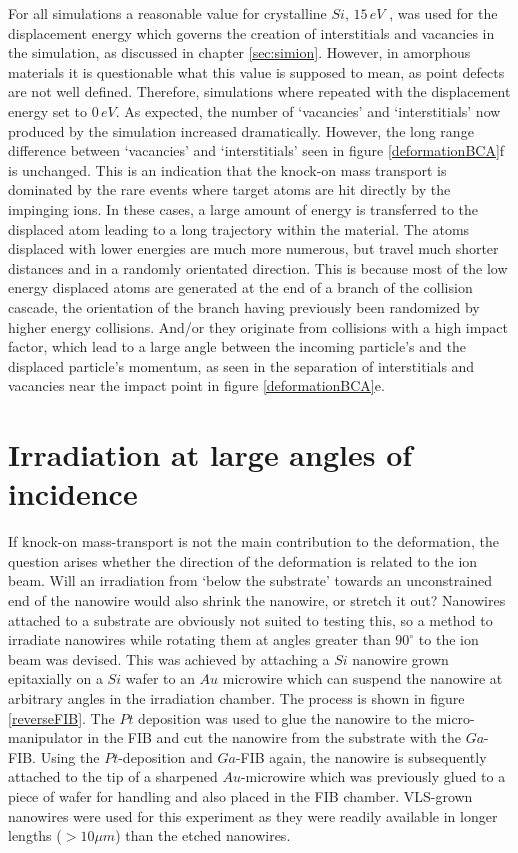 For all simulations a reasonable value for crystalline $Si$, $15\,eV$ \cite{corbett_production_1965}, was used for the displacement energy which governs the creation of interstitials and vacancies in the simulation, as discussed in chapter \ref{sec:simion}. However, in amorphous materials it is questionable what this value is supposed to mean, as point defects are not well defined. Therefore, simulations where repeated with the displacement energy set to $0\,eV$. As expected, the number of `vacancies' and `interstitials' now produced by the simulation increased dramatically. However, the long range difference between `vacancies' and `interstitials' seen in figure \ref{deformationBCA}f is unchanged. This is an indication that the knock-on mass transport is dominated by the rare events where target atoms are hit directly by the impinging ions. In these cases, a large amount of energy is transferred to the displaced atom leading to a long trajectory within the material. The atoms displaced with lower energies are much more numerous, but travel much shorter distances and in a randomly orientated direction. This is because most of the low energy displaced atoms are generated at the end of a branch of the collision cascade, the orientation of the branch having previously been randomized by higher energy collisions. And/or they originate from collisions with a high impact factor, which lead to a large angle between the incoming particle's and the displaced particle's momentum, as seen in the separation of interstitials and vacancies near the impact point in figure \ref{deformationBCA}e.

\section{Irradiation at large angles of incidence}

If knock-on mass-transport is not the main contribution to the deformation, the question arises whether the direction of the deformation is related to the ion beam. Will an irradiation from `below the substrate' towards an unconstrained end of the nanowire would also shrink the nanowire, or stretch it out? Nanowires attached to a substrate are obviously not suited to testing this, so a method to irradiate nanowires while rotating them at angles greater than $90^\circ$ to the ion beam was devised. This was achieved by attaching a $Si$ nanowire grown epitaxially on a $Si$ wafer to an $Au$ microwire which can suspend the nanowire at arbitrary angles in the irradiation chamber. The process is shown in figure \ref{reverseFIB}. The $Pt$ deposition was used to glue the nanowire to the micro-manipulator in the FIB and cut the nanowire from the substrate with the $Ga$-FIB. Using the $Pt$-deposition and $Ga$-FIB again, the nanowire is subsequently attached to the tip of a sharpened $Au$-microwire which was previously glued to a piece of wafer for handling and also placed in the FIB chamber. VLS-grown nanowires were used for this experiment as they were readily available in longer lengths ($>10\mu m$) than the etched nanowires.

